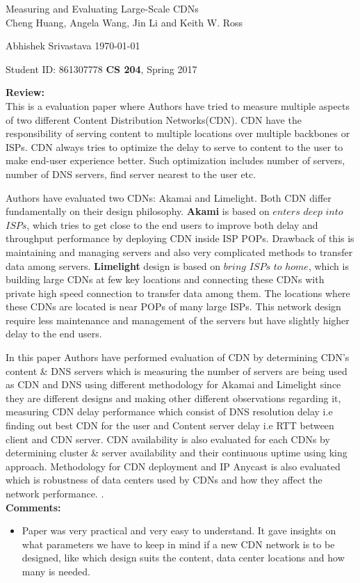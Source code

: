 \documentclass[a4paper,12pt, twoside]{article}
\renewcommand{\maketitle}{%
 	\Large
 	\begin{center}
 	Measuring and Evaluating Large-Scale CDNs\\	
 	\normalsize Cheng Huang, Angela Wang, Jin Li and Keith W. Ross
 	\end{center}
 
 	\Large
	Abhishek Srivastava
	\hfill
	\normalsize
	\today
 	\par
 	Student ID: 861307778
 	\hfill
 	\textbf{CS 204}, Spring 2017
 	\par 	
 	\hrulefill
 	\par
 	}
\begin{document}
\thispagestyle{empty}
	
\maketitle

\textbf{Review:}\\

This is a evaluation paper where Authors have tried to measure multiple aspects of two different Content Distribution Networks(CDN). CDN have the responsibility of serving content to multiple locations over multiple backbones or ISPs. CDN always tries to optimize the delay to serve to content to the user to make end-user experience better. Such optimization includes number of servers, number of DNS servers, find server nearest to the user etc.   

Authors have evaluated two CDNs: Akamai and Limelight. Both CDN differ fundamentally on their design philosophy. \textbf{Akami} is based on $enters$ $deep$ $into$ $ISPs$, which tries to get close to the end users to improve both delay and throughput performance by deploying CDN inside ISP POPs. Drawback of this is maintaining and managing servers and also very complicated methods to transfer data among servers. \textbf{Limelight} design is based on $bring$ $ISPs$ $to$ $home$, which is building large CDNs at few key locations and connecting these CDNs with private high speed connection to transfer data among them. The locations where these CDNs are located is near POPs of many large ISPs. This network design require less maintenance and management of the servers but have slightly higher delay to the end users.

In this paper Authors have performed evaluation of CDN by determining CDN's content \& DNS servers which is measuring the number of servers are being used as CDN and DNS using different methodology for Akamai and Limelight since they are different designs and making other different observations regarding it, measuring CDN delay performance which consist of DNS resolution delay i.e finding out best CDN for the user and Content server delay i.e RTT between client and CDN server. CDN availability is also evaluated for each CDNs by determining cluster \& server availability and their continuous uptime using king approach. Methodology for CDN deployment and IP Anycast is also evaluated which is robustness of data centers used by CDNs and how they affect the network performance.   
.\\

\textbf{Comments:}
\begin{itemize}
	\item Paper was very practical and very easy to understand. It gave insights on what parameters we have to keep in mind if a new CDN network is to be designed, like which design suits the content, data center locations and how many is needed.
\end{itemize}
\end{document}
